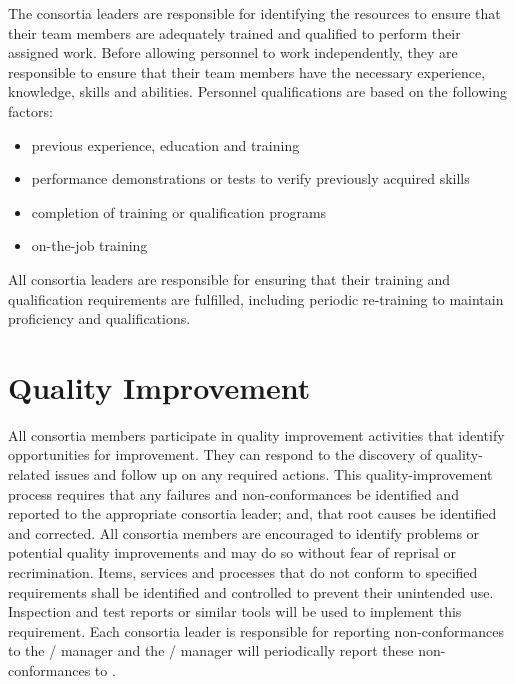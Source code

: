 The  consortia leaders are responsible for identifying the
resources to ensure that their team members are adequately trained and
qualified to perform their assigned work. Before allowing personnel to
work independently, they are responsible to ensure that their team
members have the necessary experience, knowledge, skills and
abilities. Personnel qualifications are based on the following
factors:
\begin{itemize}
 \item previous experience, education and training
 \item performance demonstrations or tests to verify previously acquired skills
 \item completion of training or qualification programs
 \item on-the-job training
\end{itemize}

All  consortia leaders are responsible for ensuring that their
training and qualification requirements are fulfilled, including
periodic re-training to maintain proficiency and qualifications.


\section{Quality Improvement}
\label{sec:quality_improvement}

All  consortia members participate in quality improvement
activities that identify opportunities for improvement. They can
respond to the discovery of quality-related issues and follow up on
any required actions. This quality-improvement process requires that
any failures and non-conformances be identified and reported to the
appropriate consortia leader; and, that root causes be identified and
corrected. All consortia members are encouraged to identify problems
or potential quality improvements and may do so without fear of
reprisal or recrimination. Items, services and processes that do not
conform to specified requirements shall be identified and controlled
to prevent their unintended use. Inspection and test reports or
similar tools will be used to implement this requirement. Each
consortia leader is responsible for reporting non-conformances to the
/  manager and the /
 manager will periodically report these non-conformances to
 .


